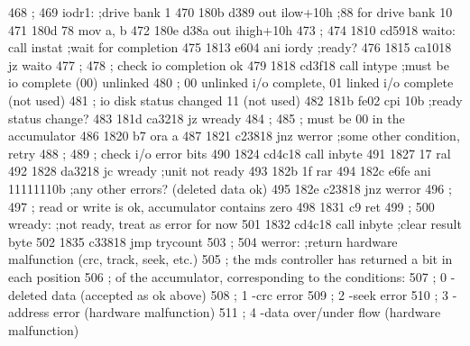 468                       ;
469                       iodr1:   ;drive bank 1
470      180b d389                 out      ilow+10h         ;88 for drive bank 10
471      180d 78                   mov      a, b
472      180e d38a                 out      ihigh+10h
473                       ;
474      1810 cd5918      waito:   call     instat           ;wait for completion
475      1813 e604                 ani      iordy            ;ready?
476      1815 ca1018               jz       waito 
477                       ;
478                       ;        check io completion ok
479      1818 cd3f18               call     intype           ;must be io complete (00) unlinked
480                       ;        00 unlinked i/o complete, 01 linked i/o complete (not used)
481                       ;        io disk status changed    11 (not used)
482      181b fe02                 cpi      10b              ;ready status change?
483      181d ca3218               jz       wready 
484                       ;
485                       ;        must be 00 in the accumulator
486      1820 b7                   ora      a
487      1821 c23818               jnz      werror           ;some other condition, retry
488                       ;
489                       ;        check i/o error bits
490      1824 cd4c18               call     inbyte
491      1827 17                   ral
492      1828 da3218               jc       wready           ;unit not ready
493      182b 1f                   rar
494      182c e6fe                 ani      11111110b        ;any other errors? (deleted data ok)
495      182e c23818               jnz      werror
496                       ;
497                       ;        read or write is ok, accumulator contains zero
498      1831 c9                   ret
499                       ;
500                       wready:  ;not ready, treat as error for now
501      1832 cd4c18               call     inbyte           ;clear result byte
502      1835 c33818               jmp      trycount
503                       ;
504                       werror:  ;return hardware malfunction (crc, track, seek, etc.)
505                       ;        the mds controller has returned a bit in each position
506                       ;        of the accumulator, corresponding to the conditions:
507                       ;        0        -deleted data (accepted as ok above)
508                       ;        1        -crc error
509                       ;        2        -seek error
510                       ;        3        -address error (hardware malfunction)
511                       ;        4        -data over/under flow (hardware malfunction)
